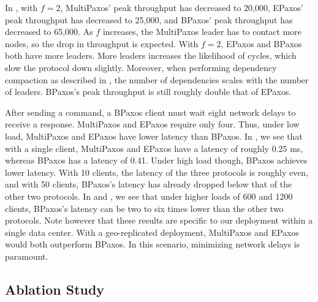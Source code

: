 In , with $f=2$, MultiPaxos' peak throughput has decreased to
20,000, EPaxos' peak throughput has decreased to 25,000, and BPaxos' peak
throughput has decreased to 65,000. As $f$ increases, the MultiPaxos leader has
to contact more nodes, so the drop in throughput is expected. With $f=2$,
EPaxos and BPaxos both have more leaders. More leaders increases the likelihood
of cycles, which slow the protocol down slightly. Moreover, when performing
dependency compaction as described in , the
number of dependencies scales with the number of leaders. BPaxos's peak
throughput is still roughly double that of EPaxos.


After sending a command, a BPaxos client must wait eight network delays to
receive a response. MultiPaxos and EPaxos require only four. Thus, under low
load, MultiPaxos and EPaxos have lower latency than BPaxos. In
, we see that with a single client, MultiPaxos and EPaxos
have a latency of roughly 0.25 ms, whereas BPaxos has a latency of 0.41. Under
high load though, BPaxos achieves lower latency. With 10 clients, the latency
of the three protocols is roughly even, and with 50 clients, BPaxos's latency
has already dropped below that of the other two protocols. In 
and , we see that under higher loads of 600 and 1200 clients,
BPaxos's latency can be two to six times lower than the other two protocols.
Note however that these results are specific to our deployment within a single
data center. With a geo-replicated deployment, MultiPaxos and EPaxos would both
outperform BPaxos. In this scenario, minimizing network delays is paramount.


\subsection{Ablation Study}
{}

